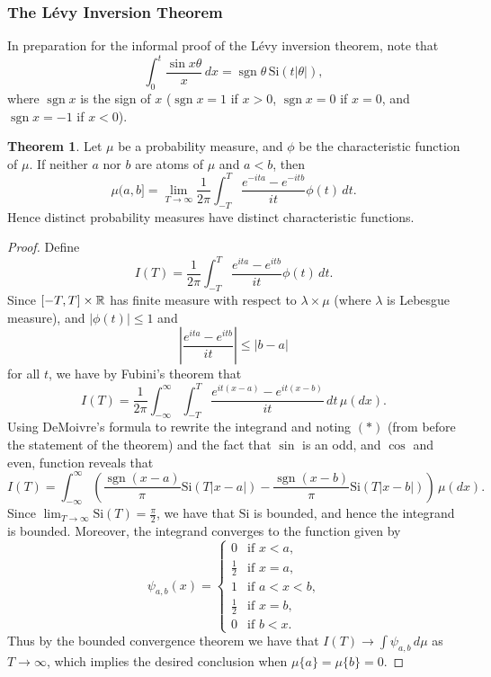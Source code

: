 \documentclass[leqno]{article}
\theoremstyle{definition}
\newtheorem{theorem}{Theorem}[section]
\newcommand\Si{\text{Si}}
\newcommand\sgn{\mathop{\text{sgn}}\nolimits}
\begin{document}
\subsubsection{The L\'evy Inversion Theorem}

In preparation for the informal proof of the L\'evy inversion theorem, note that
\begin{equation*} \tag{*}
\int_0^t \frac{\sin x\theta}{x} \, dx = \sgn \theta \, \Si(t|\theta|),
\end{equation*}
where $\sgn x$ is the sign of $x$ ($\sgn x = 1$ if $x > 0$, $\sgn x = 0$ if $x = 0$, and $\sgn x = -1$ if $x < 0$).

\begin{theorem}
Let $\mu$ be a probability measure, and $\phi$ be the characteristic function of $\mu$. If neither $a$ nor $b$ are atoms of $\mu$ and $a < b$, then
\[ \mu (a,b] = \lim_{T \rightarrow \infty} \frac{1}{2\pi} \int_{-T}^T \frac{e^{-ita} - e^{-itb}}{it} \phi(t) \, dt. \]
Hence distinct probability measures have distinct characteristic functions.
\end{theorem}

\begin{proof}
Define
\[ I(T) = \frac{1}{2\pi} \int_{-T}^T \frac{e^{ita} - e^{itb}}{it} \phi(t) \, dt. \]
Since $[-T,T] \times \mathbb{R}$ has finite measure with respect to $\lambda \times \mu$ (where $\lambda$ is Lebesgue measure), and $|\phi(t)| \le 1$ and
\[ \left|\frac{e^{ita} - e^{itb}}{it}\right| \le |b-a| \]
for all $t$, we have by Fubini's theorem that
\[ I(T) = \frac{1}{2\pi} \int_{-\infty}^\infty \int_{-T}^T \frac{e^{it(x-a)} - e^{it(x-b)}}{it} \, dt \, \mu(dx). \]
Using DeMoivre's formula to rewrite the integrand and noting $(*)$ (from before the statement of the theorem) and the fact that $\sin$ is an odd, and $\cos$ and even, function reveals that
\[ I(T) = \int_{-\infty}^\infty \left(\frac{\sgn (x-a)}{\pi} \Si(T|x-a|) - \frac{\sgn (x-b)}{\pi} \Si(T|x-b|)\right) \, \mu(dx). \]
Since $\lim_{T \rightarrow \infty} \Si(T) = \frac{\pi}{2}$, we have that $\Si$ is bounded, and hence the integrand is bounded. Moreover, the integrand converges to the function given by
\[ \psi_{a,b}(x) = \begin{cases} 0 & \text{if $x < a$,} \\
                                 \frac{1}{2} & \text{if $x = a$,} \\
                                 1 & \text{if $a < x < b$,} \\
                                 \frac{1}{2} & \text{if $x = b$,} \\
                                 0 & \text{if $b < x$.} \end{cases} \]
Thus by the bounded convergence theorem we have that $I(T) \rightarrow \int \psi_{a,b} \, d\mu$ as $T \rightarrow \infty$, which implies the desired conclusion when $\mu \{a\} = \mu \{b\} = 0$.
\end{proof}
\end{document}
